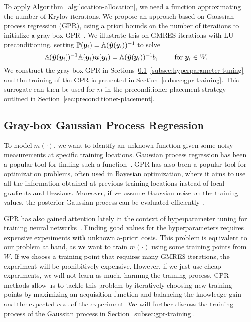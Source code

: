 To apply Algorithm~\ref{alg:location-allocation}, we need a function approximating the number of Krylov iterations.
We propose an approach based on Gaussian process regression (GPR), using a priori bounds on the number of iterations to initialize a gray-box GPR~\cite{astudillo2022}.
We illustrate this on GMRES iterations with LU preconditioning, setting $\mathbb{P}({\bm{y}_i})=\mathbb{A}(\hat{\bm{y}}({\bm{y}_i}))^{-1}$ to solve
\begin{equation}
    \mathbb{A}(\hat{\bm{y}}({\bm{y}_i}))^{-1}\mathbb{A}({\bm{y}_i}){\bm{u}}({\bm{y}_i})=\mathbb{A}(\hat{\bm{y}}({\bm{y}_i}))^{-1}b,\qquad \text{ for }{\bm{y}_i}\in W.\label{eq:precondsystem}
\end{equation}
We construct the gray-box GPR in Sections~\ref{subsec:gray-box-gpr}--\ref{subsec:hyperparameter-tuning} and the training of the GPR is presented in Section~\ref{subsec:gpr-training}.
This surrogate can then be used for $m$ in the preconditioner placement strategy outlined in Section~\ref{sec:preconditioner-placement}.


\subsection{Gray-box Gaussian Process Regression}\label{subsec:gray-box-gpr}
To model $m(\cdot)$, we want to identify an unknown function given some noisy measurements at specific training locations.
Gaussian process regression has been a popular tool for finding such a function~\cite{leibfried2020}.
GPR has also been a popular tool for optimization problems, often used in Bayesian optimization, where it aims to use all the information obtained at previous training locations instead of local gradients and Hessians.
Moreover, if we assume Gaussian noise on the training values, the posterior Gaussian process can be evaluated efficiently~\cite{bishop2006}.

GPR has also gained attention lately in the context of hyperparameter tuning for training neural networks~\cite{bardenet2013}.
Finding good values for the hyperparameters requires expensive experiments with unknown a-priori costs.
This problem is equivalent to our problem at hand, as we want to train $m(\cdot)$ using some training points from $W$.
If we choose a training point that requires many GMRES iterations, the experiment will be prohibitively expensive.
However, if we just use cheap experiments, we will not learn as much, harming the training process.
GPR methods allow us to tackle this problem by iteratively choosing new training points by maximizing an acquisition function and balancing the knowledge gain and the expected cost of the experiment.
We will further discuss the training process of the Gaussian process in Section~\ref{subsec:gpr-training}.

